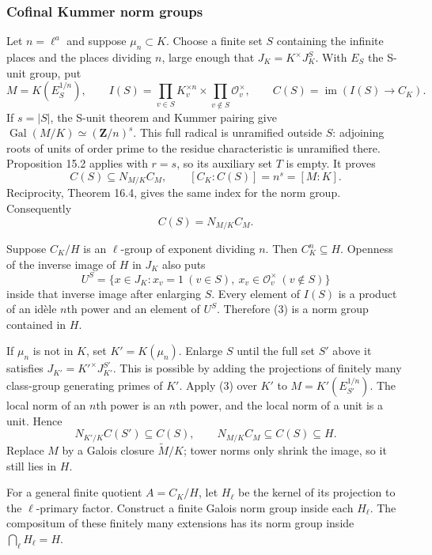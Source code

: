 \documentclass[11pt,a4paper]{article}
\begin{document}
\subsubsection{Cofinal Kummer norm
groups}\label{cofinal-kummer-norm-groups}

Let \(n=\ell^a\) and suppose \(\mu_n\subset K\). Choose a finite set
\(S\) containing the infinite places and the places dividing \(n\),
large enough that \(J_K=K^\times J_K^S\). With \(E_S\) the S-unit group,
put \[
M=K(E_S^{1/n}),\qquad
I(S)=\prod_{v\in S}K_v^{\times n}\times\prod_{v\notin S}\mathcal O_v^\times,
\qquad C(S)=\operatorname{im}(I(S)\to C_K).
\tag{2}
\] If \(s=|S|\), the S-unit theorem and Kummer pairing give
\(\operatorname{Gal}(M/K)\simeq(\mathbf Z/n)^s\). This full radical is
unramified outside \(S\): adjoining roots of units of order prime to the
residue characteristic is unramified there. Proposition 15.2 applies
with \(r=s\), so its auxiliary set \(T\) is empty. It proves \[
C(S)\subseteq N_{M/K}C_M,\qquad [C_K:C(S)]=n^s=[M:K].
\] Reciprocity, Theorem 16.4, gives the same index for the norm group.
Consequently \[
C(S)=N_{M/K}C_M.
\tag{3}
\]

Suppose \(C_K/H\) is an \(\ell\)-group of exponent dividing \(n\). Then
\(C_K^n\subseteq H\). Openness of the inverse image of \(H\) in \(J_K\)
also puts \[
U^S=\{x\in J_K:x_v=1\ (v\in S),\ x_v\in\mathcal O_v^\times\ (v\notin S)\}
\tag{4}
\] inside that inverse image after enlarging \(S\). Every element of
\(I(S)\) is a product of an idèle \(n\)th power and an element of
\(U^S\). Therefore (3) is a norm group contained in \(H\).

If \(\mu_n\) is not in \(K\), set \(K'=K(\mu_n)\). Enlarge \(S\) until
the full set \(S'\) above it satisfies \(J_{K'}=K'^\times J_{K'}^{S'}\).
This is possible by adding the projections of finitely many class-group
generating primes of \(K'\). Apply (3) over \(K'\) to
\(M=K'(E_{S'}^{1/n})\). The local norm of an \(n\)th power is an \(n\)th
power, and the local norm of a unit is a unit. Hence \[
N_{K'/K}C(S')\subseteq C(S),\qquad
N_{M/K}C_M\subseteq C(S)\subseteq H.
\tag{5}
\] Replace \(M\) by a Galois closure \(\widetilde M/K\); tower norms
only shrink the image, so it still lies in \(H\).

For a general finite quotient \(A=C_K/H\), let \(H_\ell\) be the kernel
of its projection to the \(\ell\)-primary factor. Construct a finite
Galois norm group inside each \(H_\ell\). The compositum of these
finitely many extensions has its norm group inside
\(\bigcap_\ell H_\ell=H\).
\end{document}
